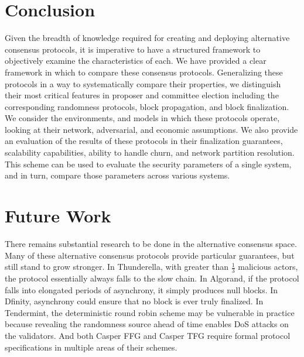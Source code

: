 \documentclass[10pt,journal,compsoc]{IEEEtran}
\begin{document}

\section{Conclusion}

Given the breadth of knowledge required for creating and deploying alternative consensus protocols, it is imperative to have a structured framework to objectively examine the characteristics of each. We have provided a clear framework in which to compare these consensus protocols.  Generalizing these protocols in a way to systematically compare their properties, we distinguish their most critical features in proposer and committee election including the corresponding randomness protocols, block propagation, and block finalization. We consider the environments, and models in which these protocols operate, looking at their network, adversarial, and economic assumptions. We also provide an evaluation of the results of these protocols in their finalization guarantees, scalability capabilities, ability to handle churn, and network partition resolution. This scheme can be used to evaluate the security parameters of a single system, and in turn, compare those parameters across various systems. 

\section{Future Work}
There remains substantial research to be done in the alternative consensus space. Many of these alternative consensus protocols provide particular guarantees, but still stand to grow stronger. In Thunderella, with greater than \(\frac{1}{3}\) malicious actors, the protocol essentially always falls to the slow chain. In Algorand, if the protocol falls into elongated periods of asynchrony, it simply produces null blocks. In Dfinity, asynchrony could ensure that no block is ever truly finalized. In Tendermint, the deterministic round robin scheme may be vulnerable in practice because revealing the randomness source ahead of time enables DoS attacks on the validators. And both Casper FFG and Casper TFG require formal protocol specifications in multiple areas of their schemes. 
\end{document}
